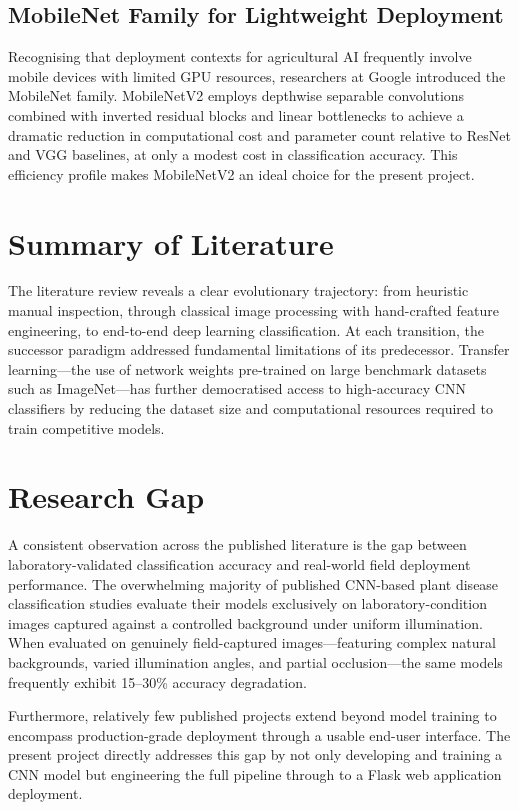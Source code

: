 \documentclass[12pt,a4paper]{report}
\begin{document}
\subsection{MobileNet Family for Lightweight Deployment}

Recognising that deployment contexts for agricultural AI frequently involve mobile devices with limited GPU resources, researchers at Google introduced the MobileNet family. MobileNetV2 employs depthwise separable convolutions combined with inverted residual blocks and linear bottlenecks to achieve a dramatic reduction in computational cost and parameter count relative to ResNet and VGG baselines, at only a modest cost in classification accuracy. This efficiency profile makes MobileNetV2 an ideal choice for the present project.

\section{Summary of Literature}

The literature review reveals a clear evolutionary trajectory: from heuristic manual inspection, through classical image processing with hand-crafted feature engineering, to end-to-end deep learning classification. At each transition, the successor paradigm addressed fundamental limitations of its predecessor. Transfer learning---the use of network weights pre-trained on large benchmark datasets such as ImageNet---has further democratised access to high-accuracy CNN classifiers by reducing the dataset size and computational resources required to train competitive models.

\section{Research Gap}

A consistent observation across the published literature is the gap between laboratory-validated classification accuracy and real-world field deployment performance. The overwhelming majority of published CNN-based plant disease classification studies evaluate their models exclusively on laboratory-condition images captured against a controlled background under uniform illumination. When evaluated on genuinely field-captured images---featuring complex natural backgrounds, varied illumination angles, and partial occlusion---the same models frequently exhibit 15--30\% accuracy degradation.

Furthermore, relatively few published projects extend beyond model training to encompass production-grade deployment through a usable end-user interface. The present project directly addresses this gap by not only developing and training a CNN model but engineering the full pipeline through to a Flask web application deployment.
\end{document}
